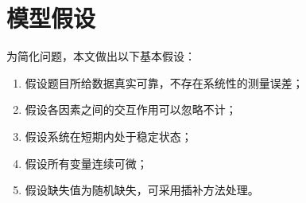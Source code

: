 \section{模型假设}


为简化问题，本文做出以下基本假设：
\begin{enumerate}
    \item 假设题目所给数据真实可靠，不存在系统性的测量误差；
    \item 假设各因素之间的交互作用可以忽略不计；
    \item 假设系统在短期内处于稳定状态；
    \item 假设所有变量连续可微；
    \item 假设缺失值为随机缺失，可采用插补方法处理。
\end{enumerate}
